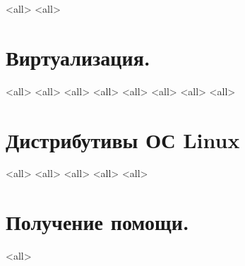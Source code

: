\mode<all>{}
\mode<all>{}
\section{Виртуализация.}
\mode<all>{}
\mode<all>{}
\mode<all>{}
\mode<all>{}
\mode<all>{}
\mode<all>{}
\mode<all>{}
\mode<all>{}

\section{Дистрибутивы ОС Linux}
\mode<all>{}
\mode<all>{}
\mode<all>{}
\mode<all>{}
\mode<all>{}
\section{Получение помощи.}
\mode<all>{}

\bye
